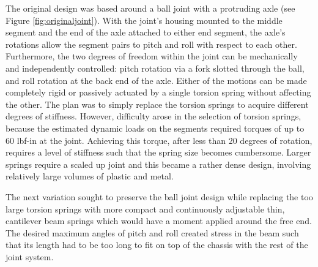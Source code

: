 \documentclass[11pt]{article}
\begin{document}
The original design was based around a ball joint with a protruding axle (see Figure \ref{fig:originaljoint}). With the joint's housing mounted to the middle segment and the end of the axle attached to either end segment, the axle's rotations allow the segment pairs to pitch and roll with respect to each other. Furthermore, the two degrees of freedom within the joint can be mechanically and independently controlled: pitch rotation via a fork slotted through the ball, and roll rotation at the back end of the axle. Either of the motions can be made completely rigid or passively actuated by a single torsion spring without affecting the other. The plan was to simply replace the torsion springs to acquire different degrees of stiffness. However, difficulty arose in the selection of torsion springs, because the estimated dynamic loads on the segments required torques of up to 60 lbf-in at the joint. Achieving this torque, after less than 20 degrees of rotation, requires a level of stiffness such that the spring size becomes cumbersome. Larger springs require a scaled up joint and this became a rather dense design, involving relatively large volumes of plastic and metal.

The next variation sought to preserve the ball joint design while replacing the too large torsion springs with more compact and continuously adjustable thin, cantilever beam springs which would have a moment applied around the free end. The desired maximum angles of pitch and roll created stress in the beam such that its length had to be too long to fit on top of the chassis with the rest of the joint system.
\end{document}
